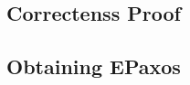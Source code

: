 \begin{comment}
Define $\opn{Lin}_g\left( \leq \right) = f\left[ V_1 \right] \cdot F\left[ V_2 \right] \cdot F\left[ V_n \right]$, where $V_i\in V\left( \hat{g} \right)$ 


Define the set of linearizations $\opn{Lins}\left( g \right)$ of a graph $g$ a the set of sequences whose length is the cardinality of $V\left( g \right)$, which contain each element of $V\left( g \right)$ exactly once, and ... \todo{or first define the partial order induced by a graph and then its compatible total orders.}

Consider a function $f$ mapping sets of commands to sequences of commands such that $f\left[ cs \right]$ contains each command in $cs$ exactly once.
A sequence of commands $cseq$ is an $f$-linearization of the graph $g$ if and only there is a sequence whose element of strongly connected 

\todo{Explain the graph processing algo independently? Its key property is that when $G1 \subseteq G2$ then $lin\left( c_1,G1 \right)$ is a prefix of $lin\left( c_2,G2 \right)$ or vice-versa.}

\end{comment}

\subsection{Correctenss Proof}

\subsection{Obtaining EPaxos}

\printbibliography%


